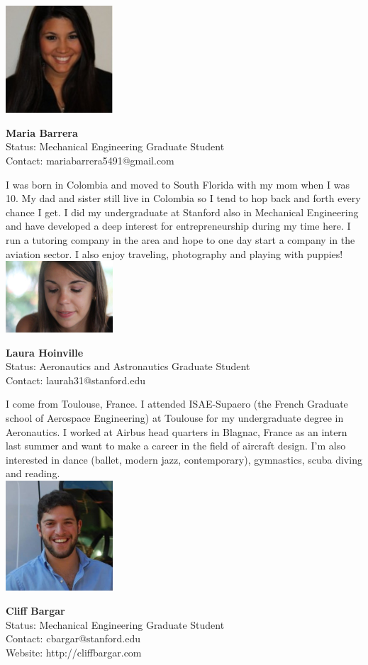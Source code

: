 \noindent \includegraphics[width=40mm]{images/image011.jpg}
\parbox[b]{0.6\textwidth}{\textbf{Maria Barrera}\\
Status: Mechanical Engineering Graduate Student\\
Contact: mariabarrera5491@gmail.com\\
}

I was born in Colombia and moved to South Florida with my mom when I was 10. My dad and sister still live in Colombia so I tend to hop back and forth every chance I get. I did my undergraduate at Stanford also in Mechanical Engineering and have developed a deep interest for entrepreneurship during my time here. I run a tutoring company in the area and hope to one day start a company in the aviation sector. I also enjoy traveling, photography and playing with puppies!
\\ 


\noindent \includegraphics[width=40mm]{images/image012bis}
\parbox[b]{0.6\textwidth}{\textbf{Laura Hoinville}\\
Status: Aeronautics and Astronautics Graduate Student\\
Contact:  laurah31@stanford.edu \\
}

I come from Toulouse, France. I attended ISAE-Supaero (the French Graduate school of Aerospace Engineering) at Toulouse for my undergraduate degree in Aeronautics. I worked at Airbus head quarters in Blagnac, France as an intern last summer and want to make a career in the field of aircraft design. I'm also interested in dance (ballet, modern jazz, contemporary), gymnastics, scuba diving and reading.
\\ 


\noindent \includegraphics[width=40mm]{images/cliff.jpg}
\parbox[b]{0.6\textwidth}{\textbf{Cliff Bargar}\\
Status: Mechanical Engineering Graduate Student\\
Contact: cbargar@stanford.edu \\
Website: http://cliffbargar.com \\
}

